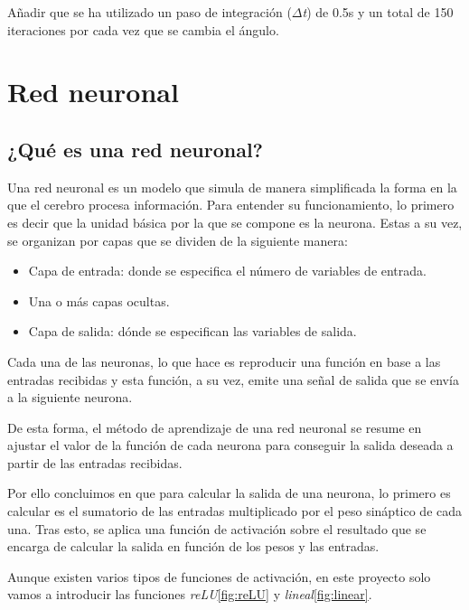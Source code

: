 Añadir que se ha utilizado un paso de integración (\textit{$\Delta$t}) de 0.5s y un total de 150 iteraciones por cada vez que se cambia el ángulo.

\section{Red neuronal}

\subsection{¿Qué es una red neuronal?}

Una red neuronal\cite{RedNeuronal} es un modelo que simula de manera simplificada la forma en la que el cerebro procesa información.
Para entender su funcionamiento, lo primero es decir que la unidad básica por la que se compone es la neurona. Estas a su vez, se organizan por capas que se dividen de la siguiente manera:
\begin{itemize}
    \item Capa de entrada: donde se especifica el número de variables de entrada.
    \item Una o más capas ocultas.
    \item Capa de salida: dónde se especifican las variables de salida.
\end{itemize}

Cada una de las neuronas, lo que hace es reproducir una función en base a las entradas recibidas y esta función, a su vez, emite una señal de salida que se envía a la siguiente neurona.

De esta forma, el método de aprendizaje de una red neuronal se resume en ajustar el valor de la función de cada neurona para conseguir la salida deseada a partir de las entradas recibidas.

Por ello concluimos en que para calcular la salida de una neurona, lo primero es calcular es el sumatorio de las entradas multiplicado por el peso sináptico de cada una. Tras esto, se aplica una función de activación\cite{FuncActivacion} sobre el resultado que se encarga de calcular la salida en función de los pesos y las entradas.

Aunque existen varios tipos de funciones de activación, en este proyecto solo vamos a introducir las funciones \textit{reLU}\ref{fig:reLU} y \textit{lineal}\ref{fig:linear}.

\label{fig:reLU}

\label{fig:linear}

